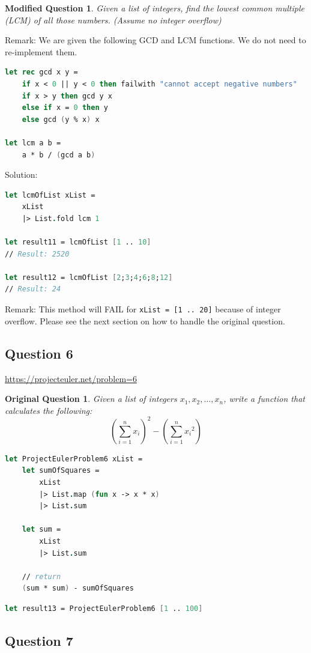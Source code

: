 \documentclass[12pt]{article}
\newtheorem*{modQuestion*}{Modified Question}
\newtheorem*{origQuestion*}{Original Question}
\begin{document}
\begin{modQuestion*}
Given a list of integers, find the lowest common multiple (LCM) of all those numbers. (Assume no integer overflow)
\end{modQuestion*}
Remark: We are given the following GCD and LCM functions. We do not need to re-implement them.
\begin{lstlisting}[language=FSharp]
let rec gcd x y =
    if x < 0 || y < 0 then failwith "cannot accept negative numbers"
    if x > y then gcd y x
    else if x = 0 then y
    else gcd (y % x) x

let lcm a b = 
    a * b / (gcd a b)
\end{lstlisting}
Solution:
\begin{lstlisting}[language=FSharp]
let lcmOfList xList =
    xList
    |> List.fold lcm 1

let result11 = lcmOfList [1 .. 10]
// Result: 2520

let result12 = lcmOfList [2;3;4;6;8;12]
// Result: 24
\end{lstlisting}
Remark: This method will FAIL for \texttt{xList = [1 .. 20]} because of integer overflow. Please see the next section on how to handle the original question.
\pagebreak
\subsection*{Question 6} 
\url{https://projecteuler.net/problem=6}
\begin{origQuestion*}
Given a list of integers $x_1, x_2, \ldots, x_n$, write a function that calculates the following:
\[
\left(\sum_{i=1}^n x_i\right)^2 - \left(\sum_{i=1}^n {x_i}^2\right)
\]
\end{origQuestion*}
\begin{lstlisting}[language=FSharp]
let ProjectEulerProblem6 xList =
    let sumOfSquares = 
        xList
        |> List.map (fun x -> x * x)
        |> List.sum

    let sum =
        xList
        |> List.sum

    // return
    (sum * sum) - sumOfSquares
\end{lstlisting}

\begin{lstlisting}[language=FSharp]
let result13 = ProjectEulerProblem6 [1 .. 100]
\end{lstlisting}

\subsection*{Question 7} 
\end{document}
